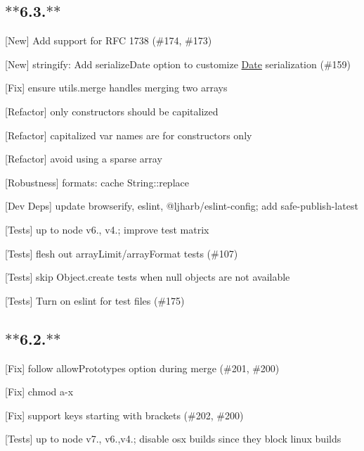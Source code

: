 \subsection*{$\ast$$\ast$6.3.$\ast$$\ast$}


\begin{DoxyItemize}
\item \mbox{[}New\mbox{]} Add support for R\+FC 1738 (\#174, \#173)
\item \mbox{[}New\mbox{]} {\ttfamily stringify}\+: Add {\ttfamily serialize\+Date} option to customize \mbox{\hyperlink{classDate}{Date}} serialization (\#159)
\item \mbox{[}Fix\mbox{]} ensure {\ttfamily utils.\+merge} handles merging two arrays
\item \mbox{[}Refactor\mbox{]} only constructors should be capitalized
\item \mbox{[}Refactor\mbox{]} capitalized var names are for constructors only
\item \mbox{[}Refactor\mbox{]} avoid using a sparse array
\item \mbox{[}Robustness\mbox{]} {\ttfamily formats}\+: cache {\ttfamily String\+::replace}
\item \mbox{[}Dev Deps\mbox{]} update {\ttfamily browserify}, {\ttfamily eslint}, {\ttfamily @ljharb/eslint-\/config}; add {\ttfamily safe-\/publish-\/latest}
\item \mbox{[}Tests\mbox{]} up to {\ttfamily node} {\ttfamily v6.}, {\ttfamily v4.}; improve test matrix
\item \mbox{[}Tests\mbox{]} flesh out array\+Limit/array\+Format tests (\#107)
\item \mbox{[}Tests\mbox{]} skip Object.\+create tests when null objects are not available
\item \mbox{[}Tests\mbox{]} Turn on eslint for test files (\#175)
\end{DoxyItemize}

\subsection*{$\ast$$\ast$6.2.$\ast$$\ast$}


\begin{DoxyItemize}
\item \mbox{[}Fix\mbox{]} follow {\ttfamily allow\+Prototypes} option during merge (\#201, \#200)
\item \mbox{[}Fix\mbox{]} chmod a-\/x
\item \mbox{[}Fix\mbox{]} support keys starting with brackets (\#202, \#200)
\item \mbox{[}Tests\mbox{]} up to {\ttfamily node} {\ttfamily v7.}, {\ttfamily v6.},{\ttfamily v4.}; disable osx builds since they block linux builds
\end{DoxyItemize}

